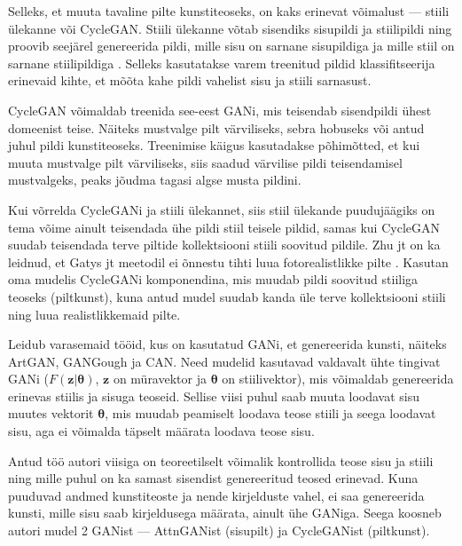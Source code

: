 \documentclass{vilgym}
\begin{document}
	Selleks, et muuta tavaline pilte kunstiteoseks, on kaks erinevat võimalust --- stiili ülekanne või CycleGAN. Stiili ülekanne võtab sisendiks sisupildi ja stiilipildi ning proovib seejärel genereerida pildi, mille sisu on sarnane sisupildiga ja mille stiil on sarnane stiilipildiga \parencite{styletransfer}.
	Selleks kasutatakse varem treenitud pildid klassifitseerija erinevaid kihte, et mõõta kahe pildi vahelist sisu ja stiili sarnasust. 

	CycleGAN võimaldab treenida see-eest GANi, mis teisendab sisendpildi ühest domeenist teise. Näiteks mustvalge pilt värviliseks, sebra hobuseks või antud juhul pildi kunstiteoseks. Treenimise käigus kasutadakse põhimõtted, et kui muuta mustvalge pilt värviliseks, siis saadud värvilise pildi teisendamisel mustvalgeks, peaks jõudma tagasi algse musta pildini. \parencite{cyclegan}

	Kui võrrelda CycleGANi ja stiili ülekannet, siis stiil ülekande puudujäägiks on tema võime ainult teisendada ühe pildi stiil teisele pildid, samas kui CycleGAN suudab teisendada terve piltide kollektsiooni stiili soovitud pildile. Zhu jt on ka leidnud, et Gatys jt meetodil ei õnnestu tihti luua fotorealistlikke pilte \parencite{cyclegan}. Kasutan oma mudelis CycleGANi komponendina, mis muudab pildi soovitud stiiliga teoseks (pilt\textrightarrow kunst), kuna antud mudel suudab kanda üle terve kollektsiooni stiili ning luua realistlikkemaid pilte.

	Leidub varasemaid tööid, kus on kasutatud GANi, et genereerida kunsti, näiteks ArtGAN\parencite{artgan}, GANGough ja CAN\parencite{can}. Need mudelid kasutavad valdavalt ühte tingivat GANi ($ F(\boldsymbol{z}|\boldsymbol{\theta}) $, $ \boldsymbol{z} $ on müravektor ja $ \boldsymbol{\theta} $ on stiilivektor), mis võimaldab genereerida erinevas stiilis ja sisuga teoseid. Sellise viisi puhul saab muuta loodavat sisu muutes vektorit $ \boldsymbol{\theta} $, mis muudab peamiselt loodava teose stiili ja seega loodavat sisu, aga ei võimalda täpselt määrata loodava teose sisu. 

	Antud töö autori viisiga on teoreetilselt võimalik kontrollida teose sisu ja stiili ning mille puhul on ka samast sisendist genereeritud teosed erinevad. Kuna puuduvad andmed kunstiteoste ja nende kirjelduste vahel, ei saa genereerida kunsti, mille sisu saab kirjeldusega määrata, ainult ühe GANiga. Seega koosneb autori mudel 2 GANist --- AttnGANist (sisu\textrightarrow pilt) ja CycleGANist (pilt\textrightarrow kunst). %
\end{document}

